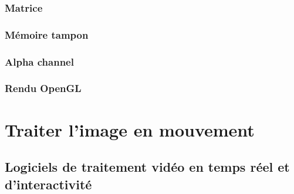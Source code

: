 \documentclass[
]{book}
\begin{document}
\hypertarget{matrice}{%
\subsection{Matrice}\label{matrice}}

\hypertarget{muxe9moire-tampon}{%
\subsection{Mémoire tampon}\label{muxe9moire-tampon}}

\hypertarget{alpha-channel}{%
\subsection{Alpha channel}\label{alpha-channel}}

\hypertarget{rendu-opengl}{%
\subsection{Rendu OpenGL}\label{rendu-opengl}}

\hypertarget{traiter}{%
\chapter{Traiter l'image en mouvement}\label{traiter}}

\hypertarget{logiciels_de_traitement_video_temps_reel}{%
\section{Logiciels de traitement vidéo en temps réel et d'interactivité}\label{logiciels_de_traitement_video_temps_reel}}
\end{document}
